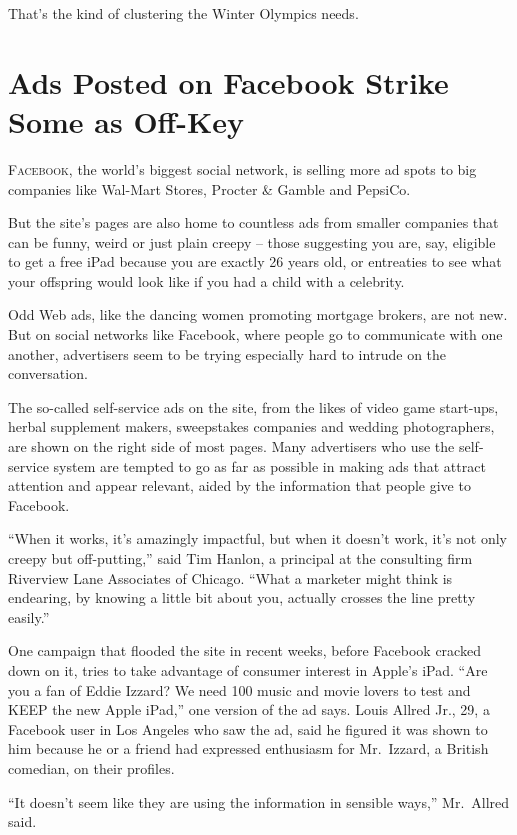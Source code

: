 ﻿\documentclass[12pt]{article}
\begin{document}
That's the kind of clustering the Winter Olympics needs.

\section{Ads Posted on Facebook Strike Some as Off-Key}

\lettrine{F}{acebook}, the world's biggest social network, is selling more
ad spots to big companies like Wal-Mart Stores, Procter \& Gamble and PepsiCo.

But the site's pages are also home to countless ads from smaller companies that can be funny, weird
or just plain creepy -- those suggesting you are, say, eligible to get a free iPad because you are
exactly 26 years old, or entreaties to see what your offspring would look like if you had a child
with a celebrity.

Odd Web ads, like the dancing women promoting mortgage brokers, are not new. But on social networks
like Facebook, where people go to communicate with one another, advertisers seem to be trying
especially hard to intrude on the conversation.

The so-called self-service ads on the site, from the likes of video game start-ups, herbal
supplement makers, sweepstakes companies and wedding photographers, are shown on the right side of
most pages. Many advertisers who use the self-service system are tempted to go as far as possible in
making ads that attract attention and appear relevant, aided by the information that people give to
Facebook.

``When it works, it's amazingly impactful, but when it doesn't work, it's not only creepy but
off-putting,'' said Tim Hanlon, a principal at the consulting firm Riverview Lane Associates of
Chicago. ``What a marketer might think is endearing, by knowing a little bit about you, actually
crosses the line pretty easily.''

One campaign that flooded the site in recent weeks, before Facebook cracked down on it, tries to
take advantage of consumer interest in Apple's iPad. ``Are you a fan of Eddie Izzard? We need 100
music and movie lovers to test and KEEP the new Apple iPad,'' one version of the ad says. Louis
Allred Jr., 29, a Facebook user in Los Angeles who saw the ad, said he figured it was shown to him
because he or a friend had expressed enthusiasm for Mr.~Izzard, a British comedian, on their
profiles.

``It doesn't seem like they are using the information in sensible ways,'' Mr.~Allred said.
\end{document}
